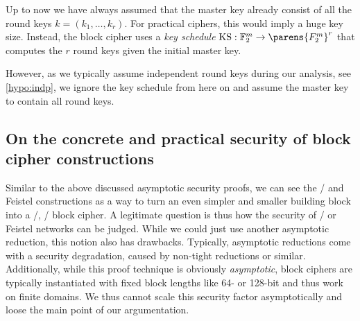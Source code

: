 Up to now we have always assumed that the master key already consist of all the round keys $k = (k_1, \ldots, k_r)$.
For practical ciphers, this would imply a huge key size.
Instead, the block cipher uses a \emph{key schedule} $\mathrm{KS} : \F_2^m \to \parens{F_2^m}^r$ that computes the $r$ round keys given the initial master key.

However, as we typically assume independent round keys during our analysis, see \cref{hypo:indp}, we ignore the key schedule from here on and assume the master key to contain all round keys.

\subsection{On the concrete and practical security of block cipher constructions}\label{sec:prelim:concrete-sec}
Similar to the above discussed asymptotic security proofs, we can see the \SPN/ and Feistel constructions as a way to turn an even simpler and smaller building block into a \PRP/, \resp/ block cipher.
A legitimate question is thus how the security of \SPNp/ or Feistel networks can be judged.
While we could just use another asymptotic reduction, this notion also has drawbacks.
Typically, asymptotic reductions come with a security degradation, caused by non-tight reductions or similar.
Additionally, while this proof technique is obviously \emph{asymptotic}, block ciphers are typically instantiated with fixed block lengths like 64- or 128-bit and thus work on finite domains.
We thus cannot scale this security factor asymptotically and loose the main point of our argumentation.

